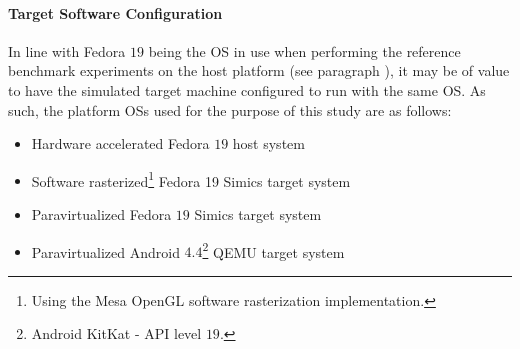 \paragraph{Target Software Configuration}
\label{par:experimentalmethodology_platformconfiguration_targetsoftwareconfiguration}
In line with Fedora $19$ being the OS in use when performing the reference benchmark experiments on the host platform (see paragraph ), it may be of value to have the simulated target machine configured to run with the same OS.
As such, the platform OSs used for the purpose of this study are as follows:
\begin{itemize}[noitemsep]
\item Hardware accelerated Fedora $19$ host system
\item Software rasterized\footnote{Using the Mesa OpenGL software rasterization implementation.} Fedora 19 Simics target system
\item Paravirtualized Fedora $19$ Simics target system
\item Paravirtualized Android $4.4$\footnote{Android KitKat - API level $19$.} QEMU target system
\end{itemize}

